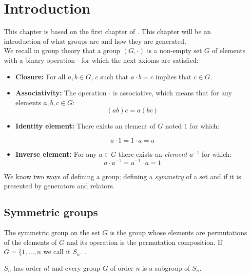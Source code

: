 \chapter{Introduction}

This chapter is based on the first chapter of \cite{magnusCombinatorialGroupTheory2004}. This chapter will be an introduction of what groups are and how they are generated.\\

We recall in group theory that a group $(G,\cdot)$ is a non-empty set $G$ of elements with a binary operation $\cdot$ for which the next axioms are satisfied:

\begin{itemize}
  \item \textbf{Closure:} For all $a,b \in G$, $c$ such that $a\cdot b = c$ implies that $c \in G$.

  \item \textbf{Associativity:} The operation $\cdot$ is associative, which means that for any elements $a,b,c \in G$:
    $$(ab)c = a(bc)$$

  \item \textbf{Identity element:} There exists an element of $G$ noted $1$ for which:

  $$a\cdot 1 = 1\cdot a = a$$

  \item \textbf{Inverse element:} For any $a \in G$ there exists an \textit{element} $a^{-1}$ for which:
  $$ a\cdot a^{-1} = a^{-1} \cdot a = 1 $$
\end{itemize}

We know two ways of defining a group; defining a \textit{symmetry} of a set and if it is presented by generators and relators.

\section{Symmetric groups}

\begin{definition}
The symmetric group on the set $G$ is the group whose elements are permutations of the elements of $G$ and its operation is the permutation composition. If $G = \{1,\dots, n$ we call it $S_n$. \cite{saganSymmetricGroup2001}.
\end{definition}

\begin{proposition}$S_n$ has order $n!$ and every group $G$ of order $n$ is a subgroup of $S_n$.
\end{proposition}

